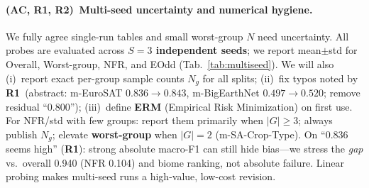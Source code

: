 \documentclass[10pt,twocolumn,letterpaper]{article}
\newcommand{\Rone}{\textcolor{RoneBlue}{\textbf{R1}}}
\newcommand{\Rtwo}{\textcolor{RtwoRed}{\textbf{R2}}}
\newcommand{\AC}{\textcolor{ACPurple}{\textbf{AC}}}
\begin{document}
{\vspace{-0.28em}
\paragraph{(\AC, \Rone, \Rtwo)\, Multi-seed uncertainty and numerical hygiene.}
We fully agree single-run tables and small worst-group $N$ need uncertainty. All probes are evaluated across \textbf{$S{=}3$ independent seeds}; we report mean$\pm$std for Overall, Worst-group, NFR, and EOdd (Tab.~\ref{tab:multiseed}). We will also (i)~report exact per-group sample counts $N_g$ for all splits; (ii)~fix typos noted by \Rone\ (abstract: m-EuroSAT $0.836{\to}0.843$, m-BigEarthNet $0.497{\to}0.520$; remove residual ``0.800''); (iii)~define \textbf{ERM} (Empirical Risk Minimization) on first use. For NFR/std with few groups: report them primarily when $|G|{\ge}3$; always publish $N_g$; elevate \textbf{worst-group} when $|G|{=}2$ (m-SA-Crop-Type). On ``0.836 seems high'' (\Rone): strong absolute macro-F1 can still hide bias---we stress the \emph{gap} vs.\ overall 0.940 (NFR 0.104) and biome ranking, not absolute failure. Linear probing makes multi-seed runs a high-value, low-cost revision.

\begin{table}[h]
\centering
\vspace{-0.35em}
\caption{3-seed evaluation (Mean$\pm$Std) across downstream datasets for Prithvi-EO-2.0.}
\label{tab:multiseed}
\scriptsize
{}
\vspace{-0.75em}
\end{table}

}
\end{document}
